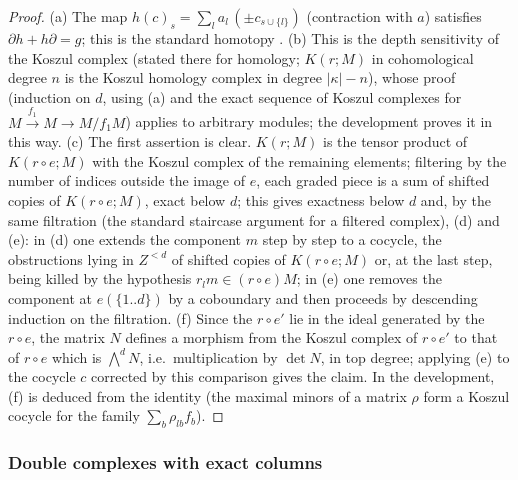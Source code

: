 \begin{proof}
(a) The map $h(c)_s=\sum_la_l\,(\pm c_{s\cup\{l\}})$ (contraction with $a$) satisfies $\partial h+h\partial=g$; this is the standard homotopy
\cite[\S17]{Eisenbud1995}. (b) This is the depth sensitivity of the Koszul complex \cite[\S1.6]{BrunsHerzog1993}
(stated there for homology; $K(r;M)$ in cohomological degree $n$ is the Koszul homology complex in degree $|\kappa|-n$), whose proof (induction on
$d$, using (a) and the exact sequence of Koszul complexes for $M\xrightarrow{f_1}M\to M/f_1M$) applies to arbitrary modules; the development
proves it in this way. (c) The first assertion is clear. $K(r;M)$ is the tensor product of $K(r\circ e;M)$ with the Koszul complex of the remaining
elements; filtering by the number of indices outside the image of $e$, each graded piece is a sum of shifted copies of $K(r\circ e;M)$, exact
below $d$; this gives exactness below $d$ and, by the same filtration (the standard staircase argument for a filtered complex), (d) and (e): in
(d) one extends the component $m$ step by step to a cocycle, the obstructions lying in $Z^{<d}$ of shifted copies of $K(r\circ e;M)$ or, at the
last step, being killed by the hypothesis $r_lm\in(r\circ e)M$; in (e) one removes the component at $e(\{1..d\})$ by a coboundary and then
proceeds by descending induction on the filtration. (f) Since the $r\circ e'$ lie in the ideal generated by the $r\circ e$, the matrix $N$
defines a morphism from the Koszul complex of $r\circ e'$ to that of $r\circ e$ which is $\bigwedge^dN$, i.e.\ multiplication by $\det N$, in top
degree; applying (e) to the cocycle $c$ corrected by this comparison gives the claim. In the development, (f) is deduced from the identity
 (the maximal minors of a matrix $\rho$ form a Koszul cocycle for the family
$\sum_b\rho_{lb}f_b$).
\end{proof}

\subsubsection*{Double complexes with exact columns}

